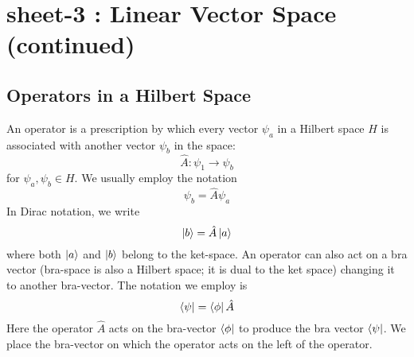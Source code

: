 \chapter{sheet-3 : Linear Vector Space (continued)}
\section{Operators in a Hilbert Space}
An operator is a prescription by which every vector $\psi_a$ in a Hilbert space $H$ is associated with another vector $\psi_b$ in the space:
\begin{equation}\label{eqn3.1}
\hat{A} : \psi_1 \rightarrow \psi_b
\end{equation}
for $\psi_a , \psi_b \in H$. We usually employ the notation
\begin{equation}\label{eqn3.2}
\psi_b = \hat{A}\psi_a
\end{equation}
In Dirac notation, we write
\begin{equation}\label{eqn3.3}
\ket{b} = \hat{A}\ket{a}
\end{equation}
where both $\ket{a}$ and $\ket{b}$ belong to the ket-space. An operator can also act on a bra vector (bra-space is also a Hilbert space; it is dual to the ket space) changing it to another bra-vector. The notation we employ is
\begin{equation}\label{eqn3.4}
\bra{\psi} = \bra{\phi} \hat{A}
\end{equation}
Here the operator $\hat{A}$ acts on the bra-vector $\bra{\phi}$ to produce the bra vector $\bra{\psi}$. We place the bra-vector on which the operator acts on the left of the operator.

